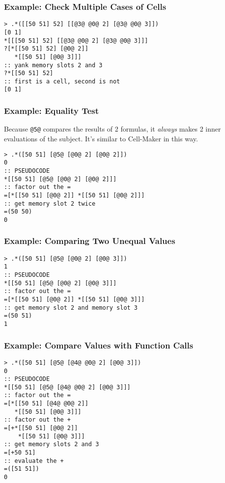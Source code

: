 \documentclass[twoside]{article}
\begin{document}
\subsubsection{Example:  Check Multiple Cases of Cells}

\begin{lstlisting}[style=listingcode]
> .*([[50 51] 52] [[@3@ @0@ 2] [@3@ @0@ 3]])
[0 1]
*[[[50 51] 52] [[@3@ @0@ 2] [@3@ @0@ 3]]]
?[*[[50 51] 52] [@0@ 2]] 
   *[[50 51] [@0@ 3]]]
:: yank memory slots 2 and 3
?*[[50 51] 52]
:: first is a cell, second is not
[0 1]
\end{lstlisting}

\subsubsection{Example:  Equality Test}

Because \lstinline[style=inlinecode]{@5@} compares the results of 2 formulas, it \emph{always} makes 2 inner evaluations of the subject. It's similar to Cell-Maker in this way.

\begin{lstlisting}[style=listingcode]
> .*([50 51] [@5@ [@0@ 2] [@0@ 2]])
0
:: PSEUDOCODE
*[[50 51] [@5@ [@0@ 2] [@0@ 2]]]
:: factor out the =
=[*[[50 51] [@0@ 2]] *[[50 51] [@0@ 2]]]
:: get memory slot 2 twice
=(50 50)
0
\end{lstlisting}

\subsubsection{Example:  Comparing Two Unequal Values}

\begin{lstlisting}[style=listingcode]
> .*([50 51] [@5@ [@0@ 2] [@0@ 3]])
1
:: PSEUDOCODE
*[[50 51] [@5@ [@0@ 2] [@0@ 3]]]
:: factor out the =
=[*[[50 51] [@0@ 2]] *[[50 51] [@0@ 3]]]
:: get memory slot 2 and memory slot 3
=(50 51)
1
\end{lstlisting}

\subsubsection{Example:  Compare Values with Function Calls}

\begin{lstlisting}[style=listingcode]
> .*([50 51] [@5@ [@4@ @0@ 2] [@0@ 3]])
0
:: PSEUDOCODE
*[[50 51] [@5@ [@4@ @0@ 2] [@0@ 3]]]
:: factor out the =
=[*[[50 51] [@4@ @0@ 2]] 
   *[[50 51] [@0@ 3]]]
:: factor out the +
=[+*[[50 51] [@0@ 2]] 
    *[[50 51] [@0@ 3]]]
:: get memory slots 2 and 3
=[+50 51]
:: evaluate the +
=([51 51])
0
\end{lstlisting}
\end{document}
